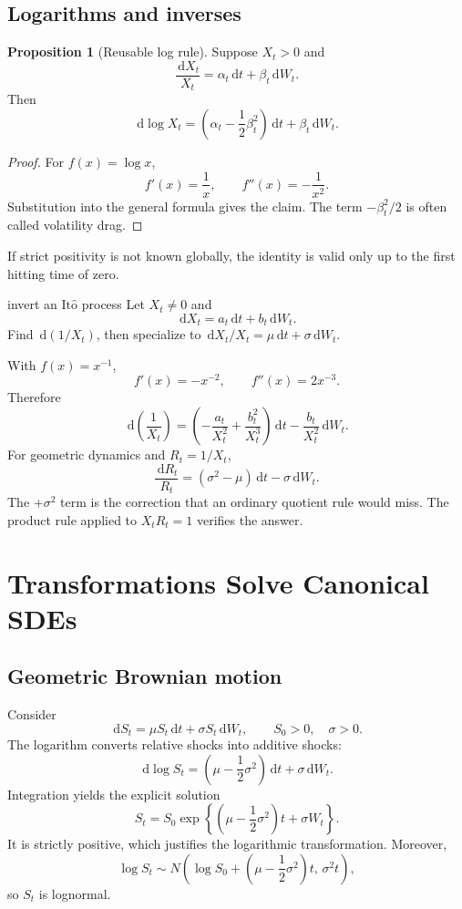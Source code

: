 \documentclass[10pt]{article}
\newcommand{\1}{\mathbf 1}
\newcommand{\dd}{\,\mathrm d}
\newcommand{\Ito}{\mathrm{It\hat{o}}}
\theoremstyle{definition}
\newtheorem{proposition}[definition]{Proposition}
\begin{document}
\subsection{Logarithms and inverses}

\begin{proposition}[Reusable log rule]
Suppose \(X_t>0\) and
\[
\frac{\dd X_t}{X_t}=\alpha_t\dd t+\beta_t\dd W_t.
\]
Then
\[
\boxed{
\dd\log X_t
=\left(\alpha_t-\frac12\beta_t^2\right)\dd t
+\beta_t\dd W_t.}
\]
\end{proposition}

\begin{proof}
For \(f(x)=\log x\),
\[
f'(x)=\frac1x,\qquad f''(x)=-\frac1{x^2}.
\]
Substitution into the general formula gives the claim. The term
\(-\beta_t^2/2\) is often called volatility drag.
\end{proof}

If strict positivity is not known globally, the identity is valid only up to
the first hitting time of zero.

\begin{studentexercise}{invert an \(\Ito\) process}
Let \(X_t\neq0\) and
\[
\dd X_t=a_t\dd t+b_t\dd W_t.
\]
Find \(\dd(1/X_t)\), then specialize to
\(\dd X_t/X_t=\mu\dd t+\sigma\dd W_t\).
\end{studentexercise}
\begin{shortsolution}
With \(f(x)=x^{-1}\),
\[
f'(x)=-x^{-2},\qquad f''(x)=2x^{-3}.
\]
Therefore
\[
\boxed{
\dd\left(\frac1{X_t}\right)
=\left(-\frac{a_t}{X_t^2}+\frac{b_t^2}{X_t^3}\right)\dd t
-\frac{b_t}{X_t^2}\dd W_t.}
\]
For geometric dynamics and \(R_t=1/X_t\),
\[
\boxed{
\frac{\dd R_t}{R_t}
=(\sigma^2-\mu)\dd t-\sigma\dd W_t.}
\]
The \(+\sigma^2\) term is the correction that an ordinary quotient rule
would miss. The product rule applied to \(X_tR_t=1\) verifies the answer.
\end{shortsolution}

\section{Transformations Solve Canonical SDEs}

\subsection{Geometric Brownian motion}

Consider
\[
\dd S_t=\mu S_t\dd t+\sigma S_t\dd W_t,
\qquad S_0>0,\quad \sigma>0.
\]
The logarithm converts relative shocks into additive shocks:
\[
\dd\log S_t
=\left(\mu-\frac12\sigma^2\right)\dd t+\sigma\dd W_t.
\]
Integration yields the explicit solution
\[
\boxed{
S_t=S_0\exp\left\{
\left(\mu-\frac12\sigma^2\right)t+\sigma W_t
\right\}.}
\]
It is strictly positive, which justifies the logarithmic transformation.
Moreover,
\[
\log S_t\sim
N\left(
\log S_0+\left(\mu-\frac12\sigma^2\right)t,\,
\sigma^2t
\right),
\]
so \(S_t\) is lognormal.
\end{document}
